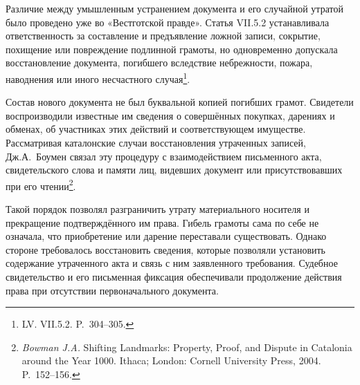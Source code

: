 Различие между умышленным устранением документа и его случайной утратой было проведено уже во «Вестготской правде». Статья VII.5.2 устанавливала ответственность за составление и предъявление ложной записи, сокрытие, похищение или повреждение подлинной грамоты, но одновременно допускала восстановление документа, погибшего вследствие небрежности, пожара, наводнения или иного несчастного случая\footnote{LV. VII.5.2. P.~304--305.}.

Состав нового документа не был буквальной копией погибших грамот. Свидетели воспроизводили известные им сведения о совершённых покупках, дарениях и обменах, об участниках этих действий и соответствующем имуществе. Рассматривая каталонские случаи восстановления утраченных записей, Дж.А.~Боумен связал эту процедуру с взаимодействием письменного акта, свидетельского слова и памяти лиц, видевших документ или присутствовавших при его чтении\footnote{\emph{Bowman J.A. }Shifting Landmarks: Property, Proof, and Dispute in Catalonia around the Year 1000. Ithaca; London: Cornell University Press, 2004. P.~152--156.}.

Такой порядок позволял разграничить утрату материального носителя и прекращение подтверждённого им права. Гибель грамоты сама по себе не означала, что приобретение или дарение переставали существовать. Однако стороне требовалось восстановить сведения, которые позволяли установить содержание утраченного акта и связь с ним заявленного требования. Судебное свидетельство и его письменная фиксация обеспечивали продолжение действия права при отсутствии первоначального документа.


